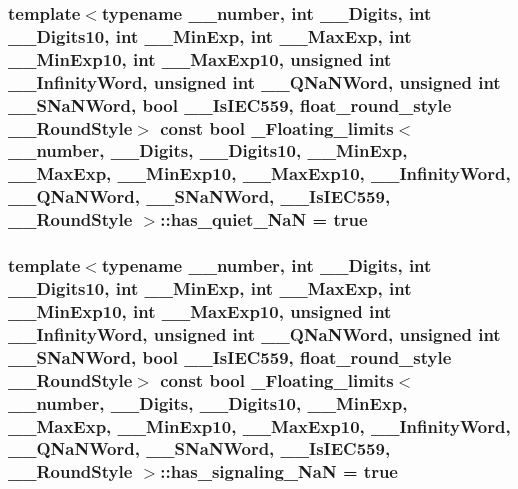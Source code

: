 \subsubsection[{has\+\_\+quiet\+\_\+\+Na\+N}]{\setlength{\rightskip}{0pt plus 5cm}template$<$typename \+\_\+\+\_\+number, int \+\_\+\+\_\+\+Digits, int \+\_\+\+\_\+\+Digits10, int \+\_\+\+\_\+\+Min\+Exp, int \+\_\+\+\_\+\+Max\+Exp, int \+\_\+\+\_\+\+Min\+Exp10, int \+\_\+\+\_\+\+Max\+Exp10, unsigned int \+\_\+\+\_\+\+Infinity\+Word, unsigned int \+\_\+\+\_\+\+Q\+Na\+N\+Word, unsigned int \+\_\+\+\_\+\+S\+Na\+N\+Word, bool \+\_\+\+\_\+\+Is\+I\+E\+C559, float\+\_\+round\+\_\+style \+\_\+\+\_\+\+Round\+Style$>$ const {\bf bool} {\bf \+\_\+\+Floating\+\_\+limits}$<$ \+\_\+\+\_\+number, \+\_\+\+\_\+\+Digits, \+\_\+\+\_\+\+Digits10, \+\_\+\+\_\+\+Min\+Exp, \+\_\+\+\_\+\+Max\+Exp, \+\_\+\+\_\+\+Min\+Exp10, \+\_\+\+\_\+\+Max\+Exp10, \+\_\+\+\_\+\+Infinity\+Word, \+\_\+\+\_\+\+Q\+Na\+N\+Word, \+\_\+\+\_\+\+S\+Na\+N\+Word, \+\_\+\+\_\+\+Is\+I\+E\+C559, \+\_\+\+\_\+\+Round\+Style $>$\+::has\+\_\+quiet\+\_\+\+Na\+N = {\bf true}\hspace{0.3cm}{\ttfamily [static]}}\label{class__Floating__limits_a70a0355563c0a25e0704bd01ea336c18}
\hypertarget{class__Floating__limits_a10ed29d9cd801729180e3cd18d1612ca}{}
\subsubsection[{has\+\_\+signaling\+\_\+\+Na\+N}]{\setlength{\rightskip}{0pt plus 5cm}template$<$typename \+\_\+\+\_\+number, int \+\_\+\+\_\+\+Digits, int \+\_\+\+\_\+\+Digits10, int \+\_\+\+\_\+\+Min\+Exp, int \+\_\+\+\_\+\+Max\+Exp, int \+\_\+\+\_\+\+Min\+Exp10, int \+\_\+\+\_\+\+Max\+Exp10, unsigned int \+\_\+\+\_\+\+Infinity\+Word, unsigned int \+\_\+\+\_\+\+Q\+Na\+N\+Word, unsigned int \+\_\+\+\_\+\+S\+Na\+N\+Word, bool \+\_\+\+\_\+\+Is\+I\+E\+C559, float\+\_\+round\+\_\+style \+\_\+\+\_\+\+Round\+Style$>$ const {\bf bool} {\bf \+\_\+\+Floating\+\_\+limits}$<$ \+\_\+\+\_\+number, \+\_\+\+\_\+\+Digits, \+\_\+\+\_\+\+Digits10, \+\_\+\+\_\+\+Min\+Exp, \+\_\+\+\_\+\+Max\+Exp, \+\_\+\+\_\+\+Min\+Exp10, \+\_\+\+\_\+\+Max\+Exp10, \+\_\+\+\_\+\+Infinity\+Word, \+\_\+\+\_\+\+Q\+Na\+N\+Word, \+\_\+\+\_\+\+S\+Na\+N\+Word, \+\_\+\+\_\+\+Is\+I\+E\+C559, \+\_\+\+\_\+\+Round\+Style $>$\+::has\+\_\+signaling\+\_\+\+Na\+N = {\bf true}\hspace{0.3cm}{\ttfamily [static]}}\label{class__Floating__limits_a10ed29d9cd801729180e3cd18d1612ca}
\hypertarget{class__Floating__limits_ae1ea549d1fdb02edf5d8d2d5b0856991}{}
